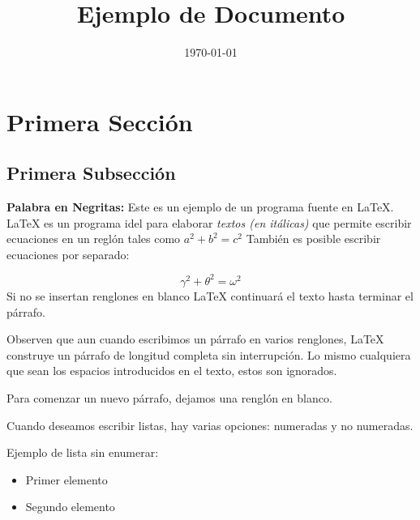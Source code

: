 \documentclass{article}
\title{Ejemplo de Documento}
\date{\today}
\begin{document}
  

\maketitle 
    
\section{Primera Sección} 
\subsection{Primera Subsección}

    
\textbf{Palabra en Negritas:} Este es un ejemplo de un programa fuente en \LaTeX.
     \LaTeX{} es un programa idel para elaborar \textit{textos (en itálicas)} que permite 
escribir ecuaciones
en un reglón tales como 
      $a^2+b^2=c^2$ 
También es posible escribir ecuaciones por separado:

    \begin{equation} 
    \gamma^2+\theta^2=\omega^2
    \end{equation}
Si no se insertan renglones en blanco \LaTeX{} continuará el texto hasta terminar el párrafo. 
 
Observen que aun cuando escribimos un párrafo en 
varios renglones, \LaTeX{} construye un párrafo de
longitud completa sin interrupción. Lo mismo        cualquiera     que sean   los    espacios   introducidos
en                        el                texto, estos      son ignorados.
 
Para comenzar un nuevo párrafo, dejamos una renglón en blanco. 
 
Cuando deseamos escribir listas, hay varias opciones: numeradas y no numeradas.
 
Ejemplo de lista sin enumerar:
\begin{itemize}
\item {Primer elemento}
\item {Segundo elemento}
\end{itemize}
 
\end{document}
